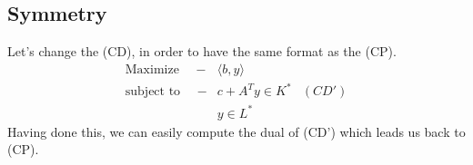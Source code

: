 \documentclass[12pt]{article}
\begin{document}
	\subsection{Symmetry}
   	Let's change the (CD), in order to have the same format as the (CP).
   	\begin{align*}
    		     \text{Maximize } \quad  -&\langle b,y \rangle \\
     		 \text{subject to } \quad  -&c + A^Ty \in K^* &(CD')\\
 											  &y \in L^*   			
   	\end{align*}
	Having done this, we can easily compute the dual of (CD') which leads us back to (CP). \\
	
\end{document}
